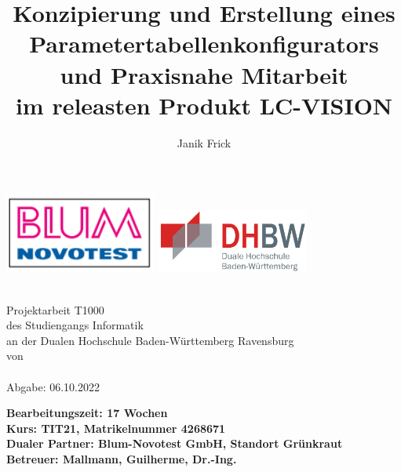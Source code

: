 \documentclass[12pt,a4paper]{article}
\author{Janik Frick}
\title{Konzipierung und Erstellung eines Parametertabellenkonfigurators und Praxisnahe Mitarbeit\\\vspace{0.35cm}
 im releasten Produkt LC-VISION}
\newcommand{\dualerPartner}{Blum-Novotest GmbH, Standort Grünkraut}
\newcommand{\hochschule}{Dualen Hochschule Baden-Württemberg Ravensburg}
\newcommand{\betreuer}{Mallmann, Guilherme, Dr.-Ing.}
\newcommand{\studiengang}{Informatik}
\newcommand{\kurs}{TIT21, Matrikelnummer 4268671}
\begin{document}
\begin{titlepage}
\includegraphics[width=50mm,scale=1]{blum-logo.PNG}
\hfill
\includegraphics[width=50mm,scale=1]{dhbw.png}
   \begin{center}
       \textbf{\huge{\thetitle}}\\
       \vspace{2cm}
       \Large{Projektarbeit T1000\\
       des Studiengangs \studiengang\\
       an der \hochschule\\
       \vspace{1.5cm}
       von\\
       \vspace{0.5cm}
       \theauthor\\
       \vspace{0.5cm}
       Abgabe: 06.10.2022\\}
       
   \end{center}
       \vspace{1.6cm}
       \noindent
       \vspace{0.3cm}
       \textbf{\large{Bearbeitungszeit: 17 Wochen}}\\
       \vspace{0.3cm }
       \textbf{\large{Kurs: \kurs}}\\
       \vspace{0.3cm}
       \textbf{\large{Dualer Partner: \dualerPartner}}\\
       \vspace{0.3cm}
       \textbf{\large{Betreuer: \betreuer}}
       

\end{titlepage}
\thispagestyle{empty}
\end{document}
